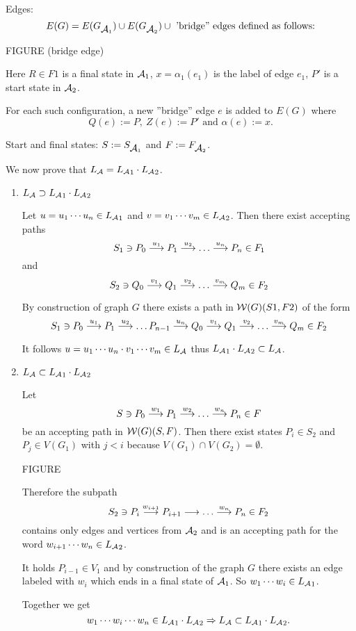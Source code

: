 Edges:
\[ E(G) = E(G_{\mbox{$\mathcal{A}$}_1}) \cup E(G_{\mbox{$\mathcal{A}$}_2}) \cup \mbox{ 'bridge'' edges
defined as follows:}
\]

FIGURE (bridge edge)

Here $R \in F1$ is a final state in $\mbox{$\mathcal{A}$}_1$, $x = \alpha_1(e_1)$ is the label
of edge $e_1$, $P'$ is a start state in $\mbox{$\mathcal{A}$}_2$.

For each such configuration, a new ''bridge''	edge $e$ is added to $E(G)$ where
\[ Q(e) := P,\ Z(e) := P' \mbox{ and } \alpha(e) := x.\]

Start and final states: $S := S_{\mbox{$\mathcal{A}$}_1}$ and $F := F_{\mbox{$\mathcal{A}$}_2}$.

We now prove that $\mbox{$L_{\mathcal{A}}$} = \mbox{$L_{\mathcal{A}}$}_1 \cdot \mbox{$L_{\mathcal{A}}$}_2$.

\begin{enumerate}
  \item $\mbox{$L_{\mathcal{A}}$} \supset \mbox{$L_{\mathcal{A}}$}_1 \cdot \mbox{$L_{\mathcal{A}}$}_2$
  
  Let $u = u_1 \cdots u_n \in \mbox{$L_{\mathcal{A}}$}_1$ and $v = v_1 \cdots v_m \in
  \mbox{$L_{\mathcal{A}}$}_2$. Then there exist accepting paths
  \[ S_1 \ni P_0 \stackrel{u_1}{\longrightarrow} P_1 \stackrel{u_2}{\longrightarrow} \ldots \stackrel{u_n}{\longrightarrow} P_n \in F_1 \]
  and 
  \[ S_2 \ni Q_0 \stackrel{v_1}{\longrightarrow} Q_1 \stackrel{v_2}{\longrightarrow} \ldots \stackrel{v_m}{\longrightarrow} Q_m \in F_2 \]
  
  By construction of graph $G$ there exists a path in $\mbox{$\mathcal{W}(G)$}(S1, F2)$ of
  the form
  \[ S_1 \ni P_0 \stackrel{u_1}{\longrightarrow} P_1 \stackrel{u_2}{\longrightarrow} \ldots P_{n-1} \stackrel{u_n}{\longrightarrow} Q_0
  \stackrel{v_1}{\longrightarrow} Q_1 \stackrel{v_2}{\longrightarrow} \ldots \stackrel{v_m}{\longrightarrow} Q_m \in F_2 \]
  
  It follows $u = u_1 \cdots u_n \cdot v_1 \cdots v_m \in \mbox{$L_{\mathcal{A}}$}$ thus
  $\mbox{$L_{\mathcal{A}}$}_1 \cdot \mbox{$L_{\mathcal{A}}$}_2 \subset \mbox{$L_{\mathcal{A}}$}$.
  
  \item $\mbox{$L_{\mathcal{A}}$} \subset \mbox{$L_{\mathcal{A}}$}_1 \cdot \mbox{$L_{\mathcal{A}}$}_2$
  
  Let \[ S \ni P_0 \stackrel{w_1}{\longrightarrow} P_1 \stackrel{w_2}{\longrightarrow} \ldots \stackrel{w_n}{\longrightarrow} P_n \in F \] be
  an accepting path in $\mbox{$\mathcal{W}(G)$}(S, F)$. Then there exist states $P_i \in
  S_2$ and $P_j \in V(G_1)$ with $j < i$ because $V(G_1) \cap V(G_2) =
  \emptyset$.
  
  FIGURE
  
  Therefore the subpath \[ S_2 \ni P_i \stackrel{w_{i+1}}{\longrightarrow} P_{i+1} \stackrel{}{\longrightarrow} \ldots
  \stackrel{w_n}{\longrightarrow} P_n \in F_2 \] contains only edges and vertices from $\mbox{$\mathcal{A}$}_2$ and
  is an accepting path for the word $w_{i+1} \cdots w_n \in \mbox{$L_{\mathcal{A}}$}_2$.
  
  It holds $P_{i-1} \in V_1$ and by construction of the graph $G$ there exists
  an edge labeled with $w_i$ which ends in a final state of $\mbox{$\mathcal{A}$}_1$. So $w_1
  \cdots w_i \in \mbox{$L_{\mathcal{A}}$}_1$.
  
  Together we get \[ w_1 \cdots w_i \cdots w_n \in \mbox{$L_{\mathcal{A}}$}_1 \cdot
  \mbox{$L_{\mathcal{A}}$}_2 \Rightarrow \mbox{$L_{\mathcal{A}}$} \subset \mbox{$L_{\mathcal{A}}$}_1 \cdot \mbox{$L_{\mathcal{A}}$}_2.\]
\end{enumerate}

